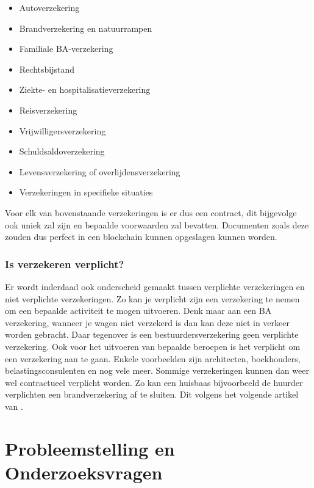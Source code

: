 \begin{itemize}
	\item Autoverzekering
	\item Brandverzekering en natuurrampen
	\item Familiale BA-verzekering
	\item Rechtsbijstand
	\item Ziekte- en hospitalisatieverzekering
	\item Reisverzekering
	\item Vrijwilligersverzekering
	\item Schuldsaldoverzekering
	\item Levensverzekering of overlijdensverzekering
	\item Verzekeringen in specifieke situaties
\end{itemize}

Voor elk van bovenstaande verzekeringen is er dus een contract, dit bijgevolge ook uniek zal zijn en bepaalde voorwaarden zal bevatten. Documenten zoals deze zouden dus perfect in een blockchain kunnen opgeslagen kunnen worden. 

\subsubsection{Is verzekeren verplicht?}
Er wordt inderdaad ook onderscheid gemaakt tussen verplichte verzekeringen en niet verplichte verzekeringen. Zo kan je verplicht zijn een verzekering te nemen om een bepaalde activiteit te mogen uitvoeren. Denk maar aan een BA verzekering, wanneer je wagen niet verzekerd is dan kan deze niet in verkeer worden gebracht. Daar tegenover is een bestuurdersverzekering geen verplichte verzekering. Ook voor het uitvoeren van bepaalde beroepen is het verplicht om een verzekering aan te gaan. Enkele voorbeelden zijn architecten, boekhouders, belastingsconsulenten en nog vele meer. Sommige verzekeringen kunnen dan weer wel contractueel verplicht worden. Zo kan een huisbaas bijvoorbeeld de huurder verplichten een brandverzekering af te sluiten. Dit volgens het volgende artikel van \textcite{BFOverplichteVerzekeringen}. 


\section{Probleemstelling en Onderzoeksvragen}
\label{sec:onderzoeksvragen}


